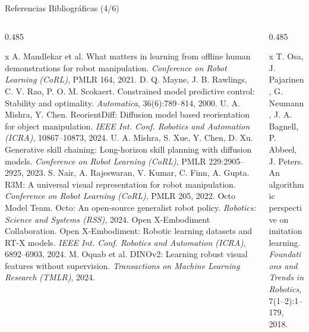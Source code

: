 \documentclass[aspectratio=169,10pt,xcolor={dvipsnames,table}]{beamer}
\begin{document}
\begin{frame}{Referencias Bibliográficas (4/6)}
  \begin{columns}[T, onlytextwidth]
    \begin{column}{0.485\textwidth}
      \RefsFont
      \begin{thebibliography}{x}\setlength{\itemsep}{0.8pt}
         A. Mandlekar et al. \newblock What matters in learning from offline human demonstrations for robot manipulation. \newblock \emph{Conference on Robot Learning (CoRL)}, PMLR 164, 2021.
         D. Q. Mayne, J. B. Rawlings, C. V. Rao, P. O. M. Scokaert. \newblock Constrained model predictive control: Stability and optimality. \newblock \emph{Automatica}, 36(6):789--814, 2000.
         U. A. Mishra, Y. Chen. \newblock ReorientDiff: Diffusion model based reorientation for object manipulation. \newblock \emph{IEEE Int. Conf. Robotics and Automation (ICRA)}, 10867--10873, 2024.
         U. A. Mishra, S. Xue, Y. Chen, D. Xu. \newblock Generative skill chaining: Long-horizon skill planning with diffusion models. \newblock \emph{Conference on Robot Learning (CoRL)}, PMLR 229:2905--2925, 2023.
         S. Nair, A. Rajeswaran, V. Kumar, C. Finn, A. Gupta. \newblock R3M: A universal visual representation for robot manipulation. \newblock \emph{Conference on Robot Learning (CoRL)}, PMLR 205, 2022.
         Octo Model Team. \newblock Octo: An open-source generalist robot policy. \newblock \emph{Robotics: Science and Systems (RSS)}, 2024.
         Open X-Embodiment Collaboration. \newblock Open X-Embodiment: Robotic learning datasets and RT-X models. \newblock \emph{IEEE Int. Conf. Robotics and Automation (ICRA)}, 6892--6903, 2024.
         M. Oquab et al. \newblock DINOv2: Learning robust visual features without supervision. \newblock \emph{Transactions on Machine Learning Research (TMLR)}, 2024.
      \end{thebibliography}
    \end{column}
    \begin{column}{0.485\textwidth}
      \RefsFont
      \begin{thebibliography}{x}\setlength{\itemsep}{0.8pt}
         T. Osa, J. Pajarinen, G. Neumann, J. A. Bagnell, P. Abbeel, J. Peters. \newblock An algorithmic perspective on imitation learning. \newblock \emph{Foundations and Trends in Robotics}, 7(1--2):1--179, 2018.

\end{thebibliography}
\end{column}
\end{columns}
\end{frame}
\end{document}
